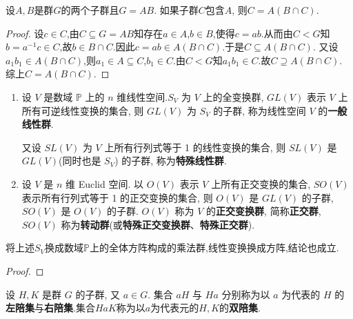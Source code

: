 \documentclass[../../main.tex]{subfiles}%
\begin{document}
\begin{example}
设$A, B$是群$G$的两个子群且$G=AB$. 如果子群$C$包含$A$, 则$C=A(B\cap C)$.
\end{example}
\begin{proof}

设$c\in C$,由$C\subseteq G=AB$知存在$a\in A$,$b\in B$,使得$c=ab$.从而由$C<G$知$b=a^{-1}c\in C$,故$b\in B\cap C$.因此$c=ab\in A\left( B\cap C \right)$.于是$C\subseteq A\left( B\cap C \right)$.
又设$a_1b_1\in A\left( B\cap C \right)$,则$a_1\in A\subseteq C$,$b_1\in C$.由$C<G$知$a_1b_1\in C$.故$C\supseteq A\left( B\cap C \right)$.
综上$C=A\left( B\cap C \right)$.

\end{proof}

\begin{theorem}
\begin{enumerate}
\item 设 \( V \) 是数域 \( \mathbb{P} \) 上的 \( n \) 维线性空间.\( S_V \) 为 \( V \) 上的全变换群, \( GL(V) \) 表示 \( V \) 上所有可逆线性变换的集合, 则 \( GL(V) \) 为 \( S_V \) 的子群, 称为线性空间 \( V \) 的\textbf{一般线性群}. 

又设 \( SL(V) \) 为 \( V \) 上所有行列式等于 1 的线性变换的集合, 则 \( SL(V) \) 是 \( GL(V) \)(同时也是 \( S_V \)) 的子群, 称为\textbf{特殊线性群}.

\item 设 \( V \) 是 \( n \) 维 Euclid 空间. 以 \( O(V) \) 表示 \( V \) 上所有正交变换的集合, \( SO(V) \) 表示所有行列式等于 1 的正交变换的集合, 则 \( O(V) \) 是 \( GL(V) \) 的子群, \( SO(V) \) 是 \( O(V) \) 的子群. \( O(V) \) 称为 \( V \) 的\textbf{正交变换群}, 简称\textbf{正交群}, \( SO(V) \) 称为\textbf{转动群}(或\textbf{特殊正交变换群}、\textbf{特殊正交群}).
\end{enumerate}
\end{theorem}
\begin{remark}
将上述$S_V$换成数域$\mathbb{P}$上的全体方阵构成的乘法群,线性变换换成方阵,结论也成立.
\end{remark}
\begin{proof}



\end{proof}

\begin{definition}
设 \( H,K \) 是群 \( G \) 的子群, 又 \( a \in G \). 集合 \( aH \) 与 \( Ha \) 分别称为以 \( a \) 为代表的 \( H \) 的\textbf{左陪集}与\textbf{右陪集}.集合$HaK$称为以$a$为代表元的$H,K$的\textbf{双陪集}.
\end{definition}
\end{document}
